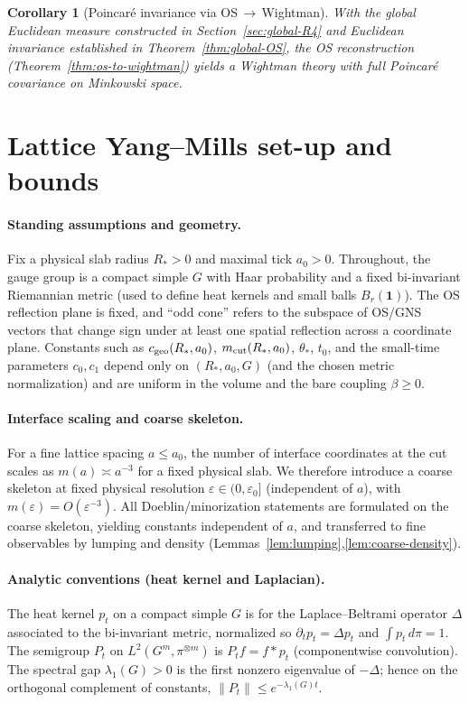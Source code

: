 \documentclass[11pt]{amsart}
\theoremstyle{plain}
\newtheorem{corollary}[theorem]{Corollary}
\theoremstyle{definition}
\theoremstyle{remark}
\begin{document}
\begin{corollary}[Poincar\'e invariance via OS\,$\to$\,Wightman]\label{cor:poincare}
With the global Euclidean measure constructed in Section~\ref{sec:global-R4} and Euclidean invariance established in Theorem~\ref{thm:global-OS}, the OS reconstruction (Theorem~\ref{thm:os-to-wightman}) yields a Wightman theory with full Poincar\'e covariance on Minkowski space.
\end{corollary}
\section{Lattice Yang--Mills set-up and bounds}
\label{sec:lattice-setup}

\paragraph{Standing assumptions and geometry.}
Fix a physical slab radius $R_*>0$ and maximal tick $a_0>0$. Throughout, the gauge group is a compact simple $G$ with Haar probability and a fixed bi-invariant Riemannian metric (used to define heat kernels and small balls $B_r(\mathbf 1)$). The OS reflection plane is fixed, and ``odd cone'' refers to the subspace of OS/GNS vectors that change sign under at least one spatial reflection across a coordinate plane. Constants such as $c_{\rm geo}(R_*,a_0)$, $m_{\rm cut}(R_*,a_0)$, $\theta_*$, $t_0$, and the small-time parameters $c_0,c_1$ depend only on $(R_*,a_0,G)$ (and the chosen metric normalization) and are uniform in the volume and the bare coupling $\beta\ge 0$.

\paragraph{Interface scaling and coarse skeleton.}
For a fine lattice spacing $a\le a_0$, the number of interface coordinates at the cut scales as $m(a)\asymp a^{-3}$ for a fixed physical slab. We therefore introduce a coarse skeleton at fixed physical resolution $\varepsilon\in(0,\varepsilon_0]$ (independent of $a$), with $m(\varepsilon)=O(\varepsilon^{-3})$. All Doeblin/minorization statements are formulated on the coarse skeleton, yielding constants independent of $a$, and transferred to fine observables by lumping and density (Lemmas~\ref{lem:lumping},\ref{lem:coarse-density}).

\paragraph{Analytic conventions (heat kernel and Laplacian).}
The heat kernel $p_t$ on a compact simple $G$ is for the Laplace--Beltrami operator $\Delta$ associated to the bi-invariant metric, normalized so $\partial_t p_t = \Delta p_t$ and $\int p_t\,d\pi=1$. The semigroup $P_t$ on $L^2(G^m,\pi^{\otimes m})$ is $P_t f = f * p_t$ (componentwise convolution). The spectral gap $\lambda_1(G)>0$ is the first nonzero eigenvalue of $-\Delta$; hence on the orthogonal complement of constants, $\|P_t\| \le e^{-\lambda_1(G) t}$.
\end{document}

